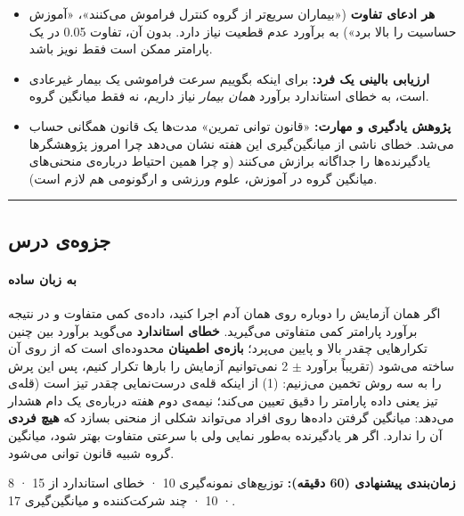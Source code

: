 \begin{itemize}
\tightlist
\item
  \textbf{هر ادعای تفاوت} («بیماران سریع‌تر از گروه کنترل فراموش می‌کنند»،
  «آموزش حساسیت را بالا برد») به برآورد عدم قطعیت نیاز دارد. بدون آن،
  تفاوت 0.05 در یک پارامتر ممکن است فقط نویز باشد.
\item
  \textbf{ارزیابی بالینی یک فرد:} برای اینکه بگوییم سرعت فراموشی یک
  بیمار غیرعادی است، به خطای استاندارد برآورد \emph{همان بیمار} نیاز
  داریم، نه فقط میانگین گروه.
\item
  \textbf{پژوهش یادگیری و مهارت:} «قانون توانی تمرین» مدت‌ها یک قانون
  همگانی حساب می‌شد. خطای ناشی از میانگین‌گیری این هفته نشان می‌دهد چرا
  امروز پژوهشگرها یادگیرنده‌ها را جداگانه برازش می‌کنند (و چرا همین احتیاط
  درباره‌ی منحنی‌های میانگین گروه در آموزش، علوم ورزشی و ارگونومی هم لازم
  است).
\end{itemize}

\begin{center}\rule{0.5\linewidth}{0.5pt}\end{center}


\subsection{جزوه‌ی درس}

\paragraph{به زبان ساده}

اگر همان آزمایش را دوباره روی همان آدم اجرا کنید، داده‌ی کمی متفاوت و در
نتیجه برآورد پارامتر کمی متفاوتی می‌گیرید. \textbf{خطای استاندارد
} می‌گوید برآورد بین چنین تکرارهایی چقدر بالا و پایین می‌پرد؛
\textbf{بازه‌ی اطمینان} محدوده‌ای است که از روی آن ساخته می‌شود (تقریباً
برآورد \ensuremath{\pm} 2  نمی‌توانیم آزمایش را بارها تکرار کنیم، پس این پرش را
به سه روش تخمین می‌زنیم: (1) از اینکه قله‌ی درست‌نمایی چقدر تیز است (قله‌ی
تیز یعنی داده پارامتر را دقیق تعیین می‌کند؛ نیمه‌ی دوم هفته درباره‌ی یک دام
هشدار می‌دهد: میانگین گرفتن داده‌ها روی افراد می‌تواند شکلی از منحنی بسازد
که \textbf{هیچ فردی} آن را ندارد. اگر هر یادگیرنده به‌طور نمایی ولی با
سرعتی متفاوت بهتر شود، میانگین گروه شبیه قانون توانی می‌شود.

\textbf{زمان‌بندی پیشنهادی (60 دقیقه):} توزیع‌های نمونه‌گیری 10 · خطای
استاندارد از  15 ·  8 ·
 10 · چند شرکت‌کننده و میانگین‌گیری 17.


